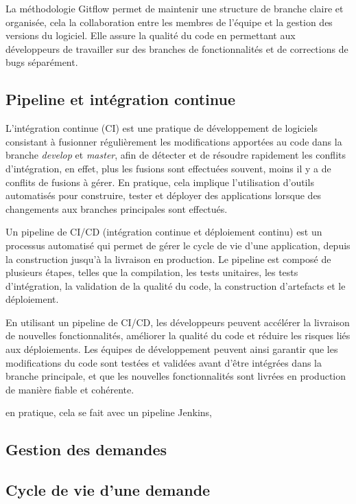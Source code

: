 \documentclass{report}
\begin{document}
La méthodologie Gitflow permet de maintenir une structure de branche claire et organisée, cela la collaboration entre les membres de l'équipe et la gestion des versions du logiciel. Elle assure la qualité du code en permettant aux développeurs de travailler sur des branches de fonctionnalités et de corrections de bugs séparément.

\subsection{Pipeline et intégration continue}
L'intégration continue (CI) est une pratique de développement de logiciels consistant à fusionner régulièrement les modifications apportées au code dans la branche \textit{develop} et \textit{master}, afin de détecter et de résoudre rapidement les conflits d'intégration, en effet, plus les fusions sont effectuées souvent, moins il y a de conflits de fusions à gérer. En pratique, cela implique l'utilisation d'outils automatisés pour construire, tester et déployer des applications lorsque des changements aux branches principales sont effectués.

Un pipeline de CI/CD (intégration continue et déploiement continu) est un processus automatisé qui permet de gérer le cycle de vie d'une application, depuis la construction jusqu'à la livraison en production. Le pipeline est composé de plusieurs étapes, telles que la compilation, les tests unitaires, les tests d'intégration, la validation de la qualité du code, la construction d'artefacts et le déploiement.

En utilisant un pipeline de CI/CD, les développeurs peuvent accélérer la livraison de nouvelles fonctionnalités, améliorer la qualité du code et réduire les risques liés aux déploiements. Les équipes de développement peuvent ainsi garantir que les modifications du code sont testées et validées avant d'être intégrées dans la branche principale, et que les nouvelles fonctionnalités sont livrées en production de manière fiable et cohérente.

en pratique, cela se fait avec un pipeline Jenkins, 

\subsection{Gestion des demandes}

\subsection{Cycle de vie d'une demande}
\end{document}
